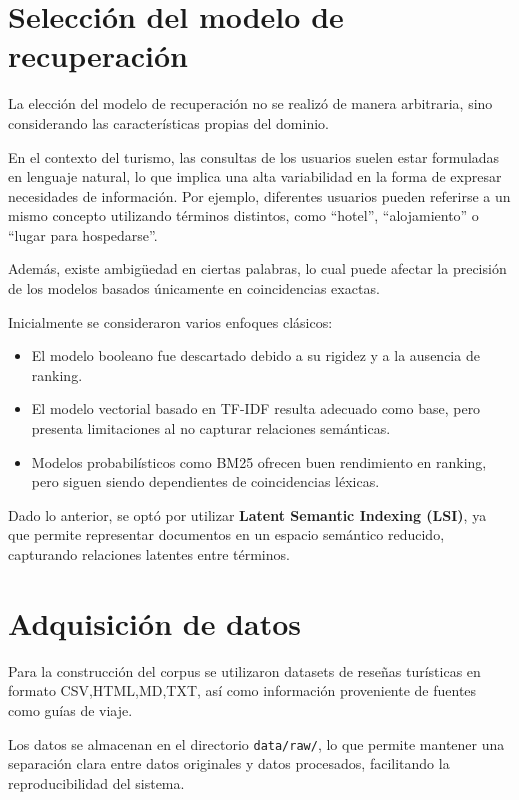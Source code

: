 \documentclass[12pt]{article}
\begin{document}
	\section{Selección del modelo de recuperación}
	
	La elección del modelo de recuperación no se realizó de manera arbitraria, sino considerando las características propias del dominio.
	
	En el contexto del turismo, las consultas de los usuarios suelen estar formuladas en lenguaje natural, lo que implica una alta variabilidad en la forma de expresar necesidades de información. Por ejemplo, diferentes usuarios pueden referirse a un mismo concepto utilizando términos distintos, como “hotel”, “alojamiento” o “lugar para hospedarse”.
	
	Además, existe ambigüedad en ciertas palabras, lo cual puede afectar la precisión de los modelos basados únicamente en coincidencias exactas.
	
	Inicialmente se consideraron varios enfoques clásicos:
	
	\begin{itemize}
		\item El modelo booleano fue descartado debido a su rigidez y a la ausencia de ranking.
		\item El modelo vectorial basado en TF-IDF resulta adecuado como base, pero presenta limitaciones al no capturar relaciones semánticas.
		\item Modelos probabilísticos como BM25 ofrecen buen rendimiento en ranking, pero siguen siendo dependientes de coincidencias léxicas.
	\end{itemize}
	
	Dado lo anterior, se optó por utilizar \textbf{Latent Semantic Indexing (LSI)}, ya que permite representar documentos en un espacio semántico reducido, capturando relaciones latentes entre términos.
	
	\section{Adquisición de datos}
	
	Para la construcción del corpus se utilizaron datasets de reseñas turísticas en formato CSV,HTML,MD,TXT, así como información proveniente de fuentes como guías de viaje.
	
	Los datos se almacenan en el directorio \texttt{data/raw/}, lo que permite mantener una separación clara entre datos originales y datos procesados, facilitando la reproducibilidad del sistema.
	
\end{document}
